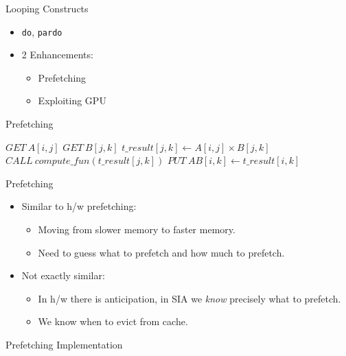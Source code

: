 \documentclass{beamer}
\begin{document}
\begin{frame}{Looping Constructs}
  \begin{itemize}
  \item \texttt{do}, \texttt{pardo}
    \pause
  \item 2 Enhancements:
    \begin{itemize}
    \item Prefetching
    \item Exploiting GPU
    \end{itemize}
  \end{itemize}
\end{frame}

\begin{frame}{Prefetching}
\begin{algorithmic}[1]
\Loop
\State $GET\ A[i, j]$
\State $GET\ B[j, k]$
\State $t\_result[j, k] \gets A[i, j] \times B[j, k]$
\State $CALL\ compute\_fun(t\_result[j, k])$
\State $PUT\ AB[i, k] \gets t\_result[i, k]$
\EndLoop
\end{algorithmic}
\end{frame}

\begin{frame}{Prefetching}
  \begin{itemize}
  \item Similar to h/w prefetching:
    \begin{itemize}
      \pause
    \item Moving from slower memory to faster memory.
      \pause
    \item Need to guess what to prefetch \pause and how much to prefetch.
    \end{itemize}

    \pause
  \item Not exactly similar:
    \begin{itemize}
    \item In h/w there is anticipation, in SIA we \textit{know} precisely what to
      prefetch.
      \pause
    \item We know when to evict from cache.
    \end{itemize}
  \end{itemize}
\end{frame}

\begin{frame}{Prefetching Implementation}
\end{frame}
\end{document}
